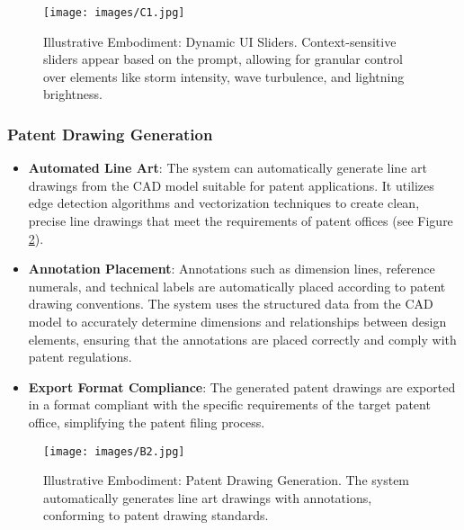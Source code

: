 \begin{figure}
\centering
\texttt{[image: images/C1.jpg]}
\caption{Illustrative Embodiment: Dynamic UI Sliders. Context-sensitive sliders appear based on the prompt, allowing for granular control over elements like storm intensity, wave turbulence, and lightning brightness.}
\label{fig:dynamic-sliders}
\end{figure}

\subsubsection{Patent Drawing Generation}
\begin{itemize}
\item \textbf{Automated Line Art}: The system can automatically generate line art drawings from the CAD model suitable for patent applications. It utilizes edge detection algorithms and vectorization techniques to create clean, precise line drawings that meet the requirements of patent offices (see Figure \ref{fig:patent-drawing}).
\item \textbf{Annotation Placement}: Annotations such as dimension lines, reference numerals, and technical labels are automatically placed according to patent drawing conventions. The system uses the structured data from the CAD model to accurately determine dimensions and relationships between design elements, ensuring that the annotations are placed correctly and comply with patent regulations.
\item \textbf{Export Format Compliance}: The generated patent drawings are exported in a format compliant with the specific requirements of the target patent office, simplifying the patent filing process.
\end{itemize}

\begin{figure}
\centering
\texttt{[image: images/B2.jpg]}
\caption{Illustrative Embodiment: Patent Drawing Generation. The system automatically generates line art drawings with annotations, conforming to patent drawing standards.}
\label{fig:patent-drawing}
\end{figure}

